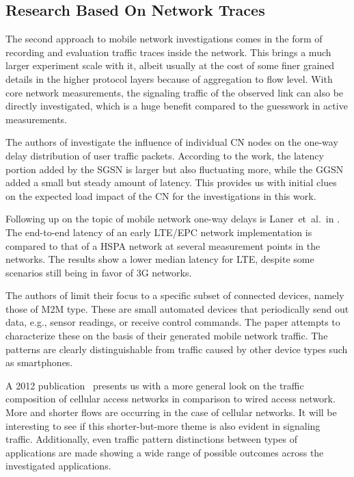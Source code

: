 \subsection{Research Based On Network Traces}

The second approach to mobile network investigations comes in the form of recording and evaluation traffic traces inside the network. This brings a much larger experiment scale with it, albeit usually at the cost of some finer grained details in the higher protocol layers because of aggregation to flow level. With core network measurements, the signaling traffic of the observed link can also be directly investigated, which is a huge benefit compared to the guesswork in active measurements.

The authors of \cite{4675847} investigate the influence of individual \gls{CN} nodes on the one-way delay distribution of user traffic packets. According to the work, the latency portion added by the \gls{SGSN} is larger but also fluctuating more, while the \gls{GGSN} added a small but steady amount of latency. This provides us with initial clues on the expected load impact of the \gls{CN} for the investigations in this work.

Following up on the topic of mobile network one-way delays is Laner~et~al.\ in \cite{laner2012delaycomparison}. The end-to-end latency of an early \gls{LTE}/\gls{EPC} network implementation is compared to that of a \gls{HSPA} network at several measurement points in the networks. The results show a lower median latency for \gls{LTE}, despite some scenarios still being in favor of \gls{3G} networks.

The authors of \cite{Shafiq:2012:FLC:2254756.2254767} limit their focus to a specific subset of connected devices, namely those of \gls{M2M} type. These are small automated devices that periodically send out data, e.g., sensor readings, or receive control commands. The paper attempts to characterize these on the basis of their generated mobile network traffic. The patterns are clearly distinguishable from traffic caused by other device types such as smartphones.

A 2012 publication~\cite{Zhang:2012:UCC:2377677.2377764} presents us with a more general look on the traffic composition of cellular access networks in comparison to wired access network. More and shorter flows are occurring in the case of cellular networks. It will be interesting to see if this shorter-but-more theme is also evident in signaling traffic. Additionally, even traffic pattern distinctions between types of applications are made showing a wide range of possible outcomes across the investigated applications.

